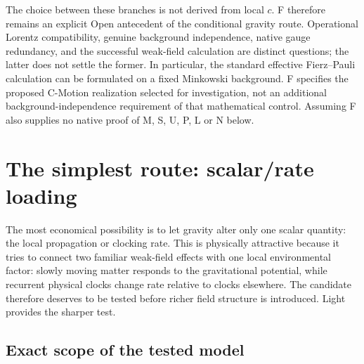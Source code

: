 \documentclass[11pt]{article}
\theoremstyle{plain}
\theoremstyle{remark}
\begin{document}
The choice between these branches is not derived from local $c$.  F therefore
remains an explicit Open antecedent of the conditional gravity route.
Operational Lorentz compatibility, genuine background independence, native
gauge redundancy, and the successful weak-field calculation are distinct
questions; the latter does not settle the former.
In particular, the standard effective Fierz--Pauli calculation can be
formulated on a fixed Minkowski background.  F specifies the proposed
C-Motion realization selected for investigation, not an additional
background-independence requirement of that mathematical control.
Assuming F also supplies no native proof of M, S, U, P, L or N below.

\section{The simplest route: scalar/rate loading}
\label{sec:scalar}

The most economical possibility is to let gravity alter only one scalar quantity: the
local propagation or clocking rate.  This is physically attractive because it tries to
connect two familiar weak-field effects with one local environmental factor: slowly
moving matter responds to the gravitational potential, while recurrent physical clocks
change rate relative to clocks elsewhere.  The candidate therefore deserves to be tested
before richer field structure is introduced.  Light provides the sharper test.

\subsection{Exact scope of the tested model}
\label{sec:scalar-scope}
\end{document}
